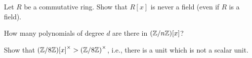 \begin{problem}
  \begin{enumalph}
    \item Let $R$ be a commutative ring.
      Show that $R[x]$ is never a field (even if $R$ is a field).
    \item How many polynomials of degree $d$ are there in $(\mathbb{Z}/n\mathbb{Z})[x]$?  
    \item Show that ${(\mathbb{Z}/8\mathbb{Z})[x]}^\times > {(\mathbb{Z}/8\mathbb{Z})}^\times$,
      i.e., there is a unit which is not a scalar unit.
  \end{enumalph}
\end{problem}
